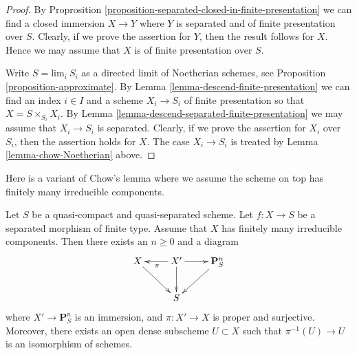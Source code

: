 \begin{proof}
By Proprosition \ref{proposition-separated-closed-in-finite-presentation}
we can find a closed immersion $X \to Y$ where $Y$ is separated
and of finite presentation over $S$. Clearly, if we prove the assertion
for $Y$, then the result follows for $X$. Hence we may assume that
$X$ is of finite presentation over $S$.

\medskip\noindent
Write $S = \text{lim}_i\ S_i$ as a directed limit of Noetherian schemes, see
Proposition \ref{proposition-approximate}. By
Lemma \ref{lemma-descend-finite-presentation} we can
find an index $i \in I$ and a scheme $X_i \to S_i$ of finite presentation
so that $X = S \times_{S_i} X_i$.
By Lemma \ref{lemma-descend-separated-finite-presentation}
we may assume that $X_i \to S_i$ is separated.
Clearly, if we prove the assertion for
$X_i$ over $S_i$, then the assertion holds for $X$. The case
$X_i \to S_i$ is treated by Lemma \ref{lemma-chow-Noetherian} above.
\end{proof}

\noindent
Here is a variant of Chow's lemma where we assume the scheme
on top has finitely many irreducible components.

\begin{lemma}
\label{lemma-chow-EGA}
Let $S$ be a quasi-compact and quasi-separated scheme.
Let $f : X \to S$ be a separated morphism of finite type.
Assume that $X$ has finitely many irreducible components.
Then there exists an $n \geq 0$ and a diagram
$$
\xymatrix{
X \ar[rd] & X' \ar[d] \ar[l]^\pi \ar[r] & \mathbf{P}^n_S \ar[dl] \\
& S &
}
$$
where $X' \to \mathbf{P}^n_S$ is an immersion, and
$\pi : X' \to X$ is proper and surjective. Moreover, there exists
an open dense subscheme $U \subset X$ such that $\pi^{-1}(U) \to U$
is an isomorphism of schemes.
\end{lemma}

